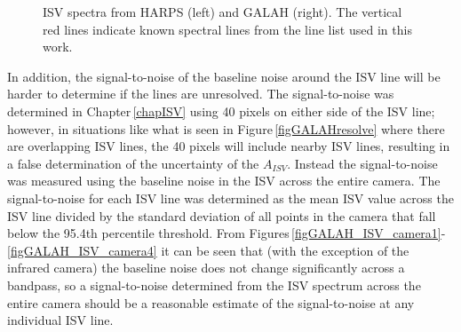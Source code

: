 \begin{figure}
	\captionsetup{width=.8\textwidth}
    \caption{ISV spectra from HARPS (left) and GALAH (right). The vertical red lines indicate known spectral lines from the line list used in this work.}
    \label{figresolve}
\end{figure}

In addition, the signal-to-noise of the baseline noise around the ISV line will be harder to determine if the lines are unresolved. The signal-to-noise was determined in Chapter\,\ref{chapISV} using 40 pixels on either side of the ISV line; however, in situations like what is seen in Figure\,\ref{figGALAHresolve} where there are overlapping ISV lines, the 40 pixels will include nearby ISV lines, resulting in a false determination of the uncertainty of the $A_{ISV}$. Instead the signal-to-noise was measured using the baseline noise in the ISV across the entire camera. The signal-to-noise for each ISV line was determined as the mean ISV value across the ISV line divided by the standard deviation of all points in the camera that fall below the 95.4th percentile threshold. From Figures\,\ref{figGALAH_ISV_camera1}-\ref{figGALAH_ISV_camera4} it can be seen that (with the exception of the infrared camera) the baseline noise does not change significantly across a bandpass, so a signal-to-noise determined from the ISV spectrum across the entire camera should be a reasonable estimate of the signal-to-noise at any individual ISV line.\\

